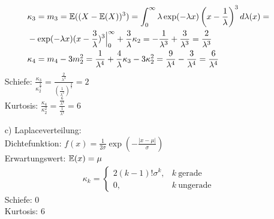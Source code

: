 \begin{solution}
\begin{itemize}
\begin{align*}
    &\kappa_3 = m_3 = \mathbb{E}((X-\mathbb{E}(X))^{3}) = \int_0^{\infty}\lambda\exp(-\lambda x)\left(x-\frac{1}{\lambda}\right)^3d\lambda(x) =\\
    &-\exp(-\lambda x)(x-\frac{3}{\lambda})^3\Big|_0^{\infty} + \frac{3}{\lambda}\kappa_2 = -\frac{1}{\lambda^3} + \frac{3}{\lambda^3} =  \frac{2}{\lambda^3} \\
    &\kappa_4 = m_4 - 3m_2^2 = \frac{1}{\lambda^4} +\frac{4}{\lambda}\kappa_3 - 3\kappa_2^2 = \frac{9}{\lambda^4} - \frac{3}{\lambda^4} =
    \frac{6}{\lambda^4}
  \end{align*}
  Schiefe: $\frac{\kappa_3}{\kappa_2^{\frac{3}{2}}} = \frac{\frac{2}{\lambda^3}}{\left(\frac{1}{\lambda^2}\right)^{\frac{3}{2}}} = 2$ \\
  Kurtosis: $\frac{\kappa_4}{\kappa_2^2} = \frac{\frac{6}{\lambda^4}}{\frac{1}{\lambda^4}} = 6$
  \item[c)] Laplaceverteilung: \\
  Dichtefunktion: $f(x) =  \frac{1}{2\sigma}\exp(-\frac{|x-\mu|}{\sigma})$ \\
  Erwartungswert: $\mathbb{E}(x) = \mu$
  \begin{align*}
    \kappa_k =
    \begin{cases} 2(k-1)!\sigma^k, & k~ \text{gerade} \\
    0, & k~ \text{ungerade}
    \end{cases}
  \end{align*}
  Schiefe: $0$ \\
  Kurtosis: $6$
\end{itemize}

\end{solution}
